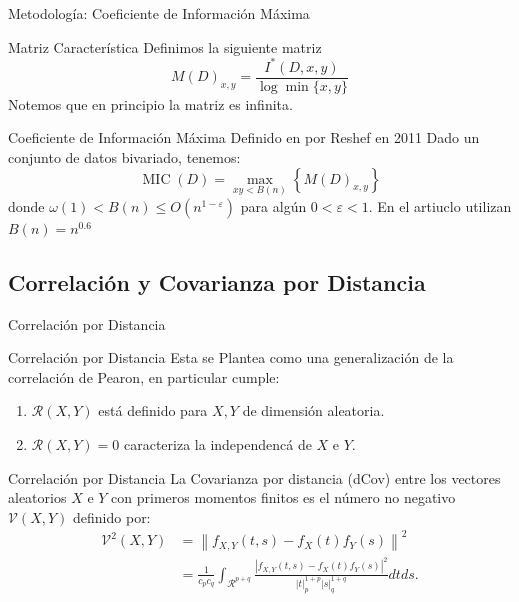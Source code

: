 \documentclass{beamer}
\begin{document}
\begin{frame}{Metodología: Coeficiente de Información Máxima}
    \begin{block}{Matriz Característica}
        Definimos la siguiente matriz       
        \begin{equation}
	    	M(D)_{x, y}=\frac{I^{*}(D, x, y)}{\log \min \{x, y\}}
        \end{equation}
        Notemos que en principio la matriz es infinita.
    \end{block}
     

    \begin{block}{Coeficiente de Información Máxima}
        Definido en por Reshef en 2011 \cite{reshef2011} Dado un conjunto de datos bivariado, tenemos:
        \begin{equation}
	    	\operatorname{MIC}(D)=\max _{x y<B(n)}\left\{M(D)_{x, y}\right\}
        \end{equation}
        donde $\omega(1)<B(n) \leq O\left(n^{1-\varepsilon}\right)$ para alg\'un $0<\varepsilon<1$. En el artiuclo utilizan $B(n)=n^{0.6}$
    \end{block}
\end{frame}

\subsection{Correlaci\'on y Covarianza por Distancia}

\begin{frame}{Correlaci\'on por Distancia}

    \begin{block}{Correlaci\'on por Distancia}
        Esta se Plantea como una generalizaci\'on de la correlaci\'on de Pearon, en particular cumple:
        \begin{enumerate}
            \item $\mathcal{R}(X,Y)$ est\'a definido para $X,Y$ de dimensi\'on aleatoria.
            \item $\mathcal{R}(X,Y) = 0$ caracteriza la independenc\'a de $X$ e $Y$.	 
        \end{enumerate}
    \end{block}

    \begin{block}{Correlaci\'on por Distancia}
        La Covarianza por distancia (dCov) entre los vectores aleatorios $X$ e $Y$ con primeros momentos finitos es el n\'umero no negativo $\mathcal{V}(X, Y)$ definido por:
        \begin{equation}
            \begin{aligned}\label{dcov_formula}
                \mathcal{V}^2(X, Y) & =\left\|f_{X, Y}(t, s)-f_X(t) f_Y(s)\right\|^2 \\
                & =\frac{1}{c_p c_q} \int_{\mathcal{R}^{p+q}} \frac{\left|f_{X, Y}(t, s)-f_X(t) f_Y(s)\right|^2}{|t|_p^{1+p}|s|_q^{1+q}} d t d s .
                \end{aligned}
        \end{equation}
    \end{block}
\end{frame}
\end{document}
